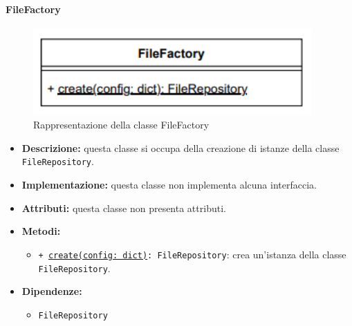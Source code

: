 \paragraph{FileFactory} \label{FileFactory}
\begin{figure}[H]
    \centering
    \includegraphics[width=0.95\textwidth]{assets/Backend/file_factory.png}
    \caption{Rappresentazione della classe FileFactory}
  \end{figure}
\begin{itemize}
    \item \textbf{Descrizione:} questa classe si occupa della creazione di istanze della classe \texttt{FileRepository}.
    \item \textbf{Implementazione:} questa classe non implementa alcuna interfaccia.
    \item \textbf{Attributi:} questa classe non presenta attributi.
    \item \textbf{Metodi:}
    \begin{itemize}
        \item \texttt{+ \underline{create(config: dict)}: FileRepository}: crea un'istanza della classe \texttt{FileRepository}.
    \end{itemize}
    \item \textbf{Dipendenze:}
    \begin{itemize}
        \item \texttt{FileRepository}
    \end{itemize}
\end{itemize} 


